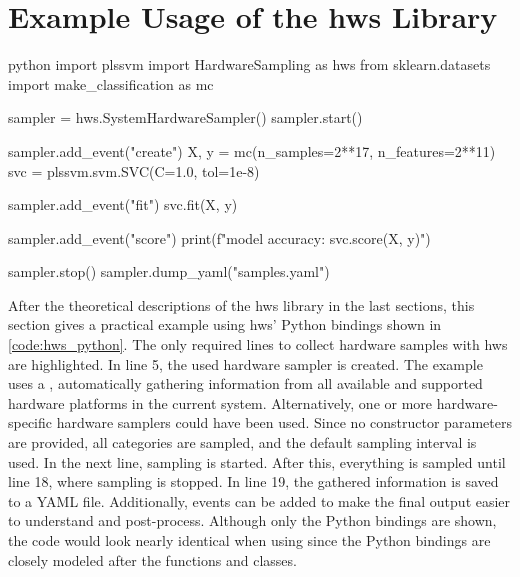 \section{Example Usage of the hws Library}
\label{sec:hws_example}

\begin{listing}
    \begin{moderncode}[highlightlines={2, 5-6, 18-19}]{python}
import plssvm
import HardwareSampling as hws
from sklearn.datasets import make_classification as mc

sampler = hws.SystemHardwareSampler()
sampler.start()

sampler.add_event("create")
X, y = mc(n_samples=2**17, n_features=2**11)
svc = plssvm.svm.SVC(C=1.0, tol=1e-8)

sampler.add_event("fit")
svc.fit(X, y)

sampler.add_event("score")
print(f"model accuracy: {svc.score(X, y)}")

sampler.stop()
sampler.dump_yaml("samples.yaml")
    \end{moderncode}
    \caption{%
    A code example showing the simplicity of the hws library. 
    With only five required lines of code, it is possible to gather information from the whole system. 
    Additionally, events can be added to make the final output easier to understand and post-process (lines 8, 12, and 15).
    }
    \label{code:hws_python}
\end{listing}

After the theoretical descriptions of the hws library in the last sections, this section gives a practical example using hws' Python bindings shown in \autoref{code:hws_python}. 
The only required lines to collect hardware samples with hws are highlighted. 
In line 5, the used hardware sampler is created. 
The example uses a , automatically gathering information from all available and supported hardware platforms in the current system. 
Alternatively, one or more hardware-specific hardware samplers could have been used. 
Since no constructor parameters are provided, all categories are sampled, and the default sampling interval is used. 
In the next line, sampling is started. 
After this, everything is sampled until line 18, where sampling is stopped. 
In line 19, the gathered information is saved to a YAML file. 
Additionally, events can be added to make the final output easier to understand and post-process. 
Although only the Python bindings are shown, the code would look nearly identical when using \cpp since the Python bindings are closely modeled after the \cpp functions and classes. 

